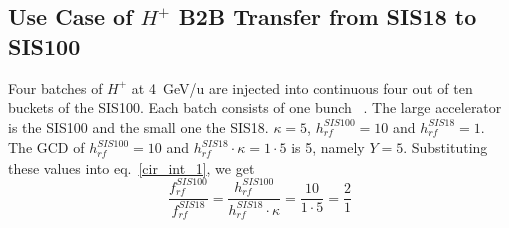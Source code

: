 %
%
%
\subsection{Use Case of $H^{+}$ B2B Transfer from SIS18 to SIS100}
\label{sec:cir_no_int1}
Four batches of $H^{+}$ at \SI{4}{GeV/\atomicmassunit} are injected into continuous four out of ten buckets of the SIS100. Each batch consists of one bunch ~\cite{liebermann_fair_2013, liebermann_sis100_2013}. The large accelerator is the SIS100 and the small one the SIS18. $\kappa=5$, $h^{\mathit{SIS100}}_\mathit{rf}=10$ and $h^{\mathit{SIS18}}_\mathit{rf}=1$. The GCD of $h^{\mathit{SIS100}}_\mathit{rf}=10$ and $h^{\mathit{SIS18}}_\mathit{rf} \cdot \kappa=1\cdot 5$ is 5, namely $Y=5$. Substituting these values into eq.~\ref{cir_int_1}, we get
\begin{equation}
\frac{f_{\mathit{rf}}^{\mathit{SIS100}}}{f_{\mathit{rf}}^{\mathit{SIS18}}}= \frac {h^{\mathit{SIS100}}_\mathit{rf}}{h^{\mathit{SIS18}}_\mathit{rf} \cdot \kappa}= \frac{10}{1 \cdot 5}=\frac{2}{1}
\end{equation}

